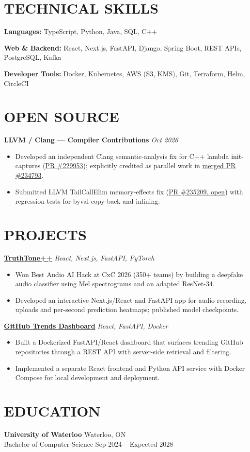 \documentclass[11pt,letterpaper]{article}
\begin{document}
\section*{TECHNICAL SKILLS}
\noindent\textbf{Languages:} TypeScript, Python, Java, SQL, C++\par
\noindent\textbf{Web \& Backend:} React, Next.js, FastAPI, Django, Spring Boot, REST APIs, PostgreSQL, Kafka\par
\noindent\textbf{Developer Tools:} Docker, Kubernetes, AWS (S3, KMS), Git, Terraform, Helm, CircleCI\par
\section*{OPEN SOURCE}
\noindent\textbf{LLVM / Clang --- Compiler Contributions} \hfill \textit{Oct 2026}\par
\begin{itemize}
\item Developed an independent Clang semantic-analysis fix for C++ lambda init-captures (\href{https://github.com/llvm/llvm-project/pull/229953}{PR \#229953}); explicitly credited as parallel work in \href{https://github.com/llvm/llvm-project/pull/234793}{merged PR \#234793}.
\item Submitted LLVM TailCallElim memory-effects fix (\href{https://github.com/llvm/llvm-project/pull/235209}{PR \#235209, open}) with regression tests for byval copy-back and inlining.
\end{itemize}
\section*{PROJECTS}
\noindent\href{https://github.com/beanscrack/Truth-Tone}{\textbf{TruthTone++}} \hfill \textit{React, Next.js, FastAPI, PyTorch}\par
\begin{itemize}
\item Won Best Audio AI Hack at CxC 2026 (350+ teams) by building a deepfake audio classifier using Mel spectrograms and an adapted ResNet-34.
\item Developed an interactive Next.js/React and FastAPI app for audio recording, uploads and per-second prediction heatmaps; published model checkpoints.
\end{itemize}
\noindent\href{https://github.com/beanscrack/real-time-dashboard}{\textbf{GitHub Trends Dashboard}} \hfill \textit{React, FastAPI, Docker}\par
\begin{itemize}
\item Built a Dockerized FastAPI/React dashboard that surfaces trending GitHub repositories through a REST API with server-side retrieval and filtering.
\item Implemented a separate React frontend and Python API service with Docker Compose for local development and deployment.
\end{itemize}
\section*{EDUCATION}
\noindent\textbf{University of Waterloo} \hfill Waterloo, ON\\
Bachelor of Computer Science \hfill Sep 2024 -- Expected 2028\par
\end{document}

